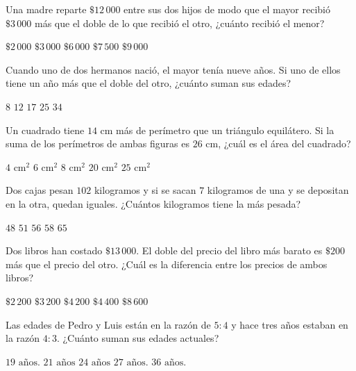 \documentclass[sin nombre]{srs}
\begin{document}
\begin{preguntas}[after-item-skip=2cm]
\pregunta Una madre reparte $\$12\,000$ entre sus dos hijos de modo que el mayor recibió $\$3\,000$ más que el doble de lo que recibió el otro, ¿cuánto recibió el menor?
\begin{vertical}
\alternativa $\$2\,000$
\alternativa $\$3\,000$
\alternativa $\$6\,000$
\alternativa $\$7\,500$
\alternativa $\$9\,000$
\end{vertical}

\pregunta Cuando uno de dos hermanos nació, el mayor tenía nueve años. Si uno de ellos tiene un año más que el doble del otro, ¿cuánto suman sus edades?
\begin{vertical}
\alternativa $8$
\alternativa $12$
\alternativa $17$
\alternativa $25$
\alternativa $34$
\end{vertical}

\pregunta Un cuadrado tiene $14 \text{ cm}$ más de perímetro que un triángulo equilátero. Si la suma de los perímetros de ambas figuras es $26 \text{ cm}$, ¿cuál es el área del cuadrado?
\begin{vertical}
\alternativa $4 \text{ cm}^2$
\alternativa $6 \text{ cm}^2$
\alternativa $8 \text{ cm}^2$
\alternativa $20 \text{ cm}^2$
\alternativa $25 \text{ cm}^2$
\end{vertical}

\pregunta Dos cajas pesan $102$ kilogramos y si se sacan $7$ kilogramos de una y se depositan en la otra, quedan iguales. ¿Cuántos kilogramos tiene la más pesada?
\begin{vertical}
\alternativa $48$
\alternativa $51$
\alternativa $56$
\alternativa $58$
\alternativa $65$
\end{vertical}

\pregunta Dos libros han costado $\$13\,000$. El doble del precio del libro más barato es $\$200$ más que el precio del otro. ¿Cuál es la diferencia entre los precios de ambos libros?
\begin{vertical}
\alternativa $\$2\,200$
\alternativa $\$3\,200$
\alternativa $\$4\,200$
\alternativa $\$4\,400$
\alternativa $\$8\,600$
\end{vertical}

\pregunta Las edades de Pedro y Luis están en la razón de $5:4$ y hace tres años estaban en la razón $4:3$. ¿Cuánto suman sus edades actuales?
\begin{vertical}
\alternativa $19 \text{ años.}$
\alternativa $21 \text{ años}$
\alternativa $24 \text{ años}$
\alternativa $27 \text{ años.}$
\alternativa $36 \text{ años.}$
\end{vertical}


\end{preguntas}
\end{document}
